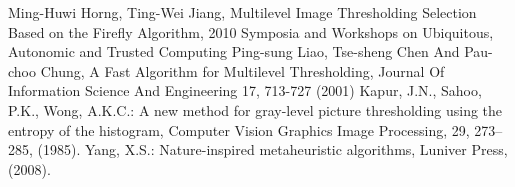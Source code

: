 \documentclass[conference]{IEEEtran}
\begin{document}
\begin{thebibliography}{00}
 Ming-Huwi Horng, Ting-Wei Jiang, Multilevel Image Thresholding Selection Based on the Firefly Algorithm, 2010 Symposia and Workshops on Ubiquitous, Autonomic and Trusted Computing
 Ping-sung Liao, Tse-sheng Chen And Pau-choo Chung, A Fast Algorithm for Multilevel Thresholding, Journal Of Information Science And Engineering 17, 713-727 (2001)
 Kapur, J.N., Sahoo, P.K., Wong, A.K.C.: A new method for gray-level picture thresholding using the entropy of the histogram, Computer Vision Graphics Image Processing, 29, 273--285, (1985).
 Yang, X.S.: Nature-inspired metaheuristic algorithms, Luniver Press,
(2008).
\end{thebibliography}
\vspace{12pt}
\end{document}
